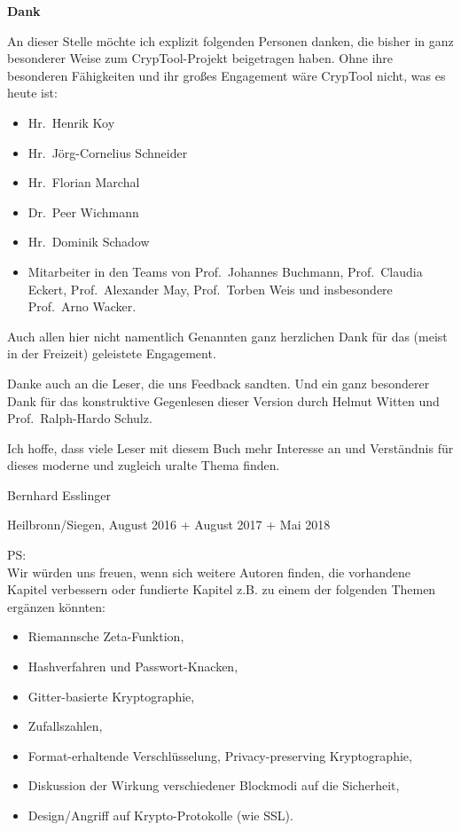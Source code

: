 

\newpage
\textbf{Dank}

An dieser Stelle möchte ich explizit folgenden Personen danken,
die bisher in ganz besonderer Weise zum CrypTool-Projekt
beigetragen haben.
Ohne ihre besonderen Fähigkeiten und ihr großes Engagement wäre CrypTool
nicht, was es heute ist:
\begin{itemize}[nosep]
   \item Hr.\ Henrik Koy
   \item Hr.\ Jörg-Cornelius Schneider
   \item Hr.\ Florian Marchal
   \item Dr.\ Peer Wichmann
   \item Hr.\ Dominik Schadow
   \item Mitarbeiter in den Teams von
         Prof.\ Johannes Buchmann,
         Prof.\ Claudia Eckert,
         Prof.~Alexander May,
         Prof.~Torben Weis und insbesondere
         Prof.\ Arno Wacker.
\end{itemize}

Auch allen hier nicht namentlich Genannten ganz herzlichen Dank für das
(meist in der Freizeit) geleistete Engagement.

Danke auch an die Leser, die uns Feedback sandten. Und ein ganz besonderer
Dank für das konstruktive Gegenlesen dieser Version durch Helmut Witten und
Prof.\ Ralph-Hardo Schulz.

Ich hoffe, dass viele Leser mit diesem Buch mehr Interesse an und
Verständnis für dieses moderne und zugleich uralte Thema finden.



\vfill

Bernhard Esslinger

\bigskip

Heilbronn/Siegen, August 2016 + August 2017 + Mai 2018



\vfill

PS:\\
Wir würden uns freuen, wenn sich weitere Autoren finden, die vorhandene Kapitel verbessern oder fundierte
Kapitel z.B. zu einem der folgenden Themen ergänzen könnten:
\begin{itemize}[nosep]
   \item Riemannsche Zeta-Funktion,
   \item Hashverfahren und Passwort-Knacken,
   \item Gitter-basierte Kryptographie,
   \item Zufallszahlen,
   \item Format-erhaltende Verschlüsselung, Privacy-preserving Kryptographie,
   \item Diskussion der Wirkung verschiedener Blockmodi auf die Sicherheit,
   \item Design/Angriff auf Krypto-Protokolle (wie SSL).
\end{itemize}


